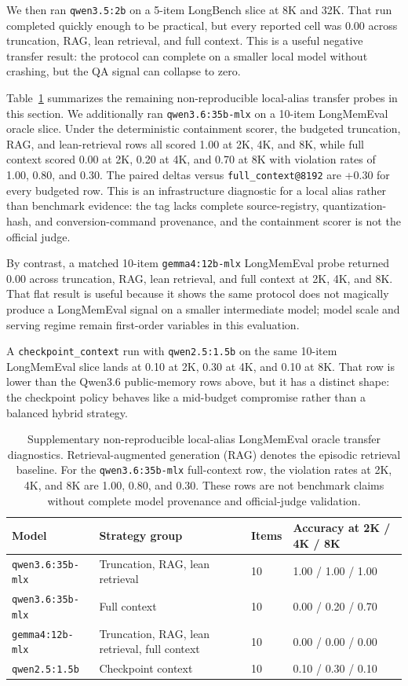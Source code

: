 \documentclass[11pt]{article}
\newcommand{\RunModel}{\texttt{qwen2.5:1.5b}}
\begin{document}
We then ran \texttt{qwen3.5:2b} on a 5-item LongBench slice at 8K and 32K.
That run completed quickly enough to be practical, but every reported cell was
0.00 across truncation, RAG, lean retrieval, and full context.  This is a
useful negative transfer result: the protocol can complete on a smaller local
model without crashing, but the QA signal can collapse to zero.

Table~\ref{tab:longmem_transfer_probes} summarizes the remaining
non-reproducible local-alias transfer probes in this section.  We additionally
ran \texttt{qwen3.6:35b-mlx} on a 10-item LongMemEval oracle
slice.  Under the deterministic containment scorer, the budgeted truncation, RAG, and lean-retrieval rows all scored 1.00
at 2K, 4K, and 8K, while full context scored 0.00 at 2K, 0.20 at 4K, and 0.70
at 8K with violation rates of 1.00, 0.80, and 0.30.  The paired deltas
versus \texttt{full\_context@8192} are +0.30 for every budgeted row.  This is
an infrastructure diagnostic for a local alias rather than benchmark evidence:
the tag lacks complete source-registry, quantization-hash, and
conversion-command provenance, and the containment scorer is not the official
judge.

By contrast, a matched 10-item \texttt{gemma4:12b-mlx} LongMemEval probe
returned 0.00 across truncation, RAG, lean retrieval, and full context at
2K, 4K, and 8K.  That flat result is useful because it shows the same protocol
does not magically produce a LongMemEval signal on a smaller intermediate
model; model scale and serving regime remain first-order variables in this
evaluation.

A \texttt{checkpoint\_context} run with \RunModel{} on the same 10-item
LongMemEval slice lands at 0.10 at 2K, 0.30 at 4K, and 0.10 at 8K.  That row is
lower than the Qwen3.6 public-memory rows above, but it has a distinct shape:
the checkpoint policy behaves like a mid-budget compromise rather than a
balanced hybrid strategy.

\begin{table}[t]
\centering
\small
\setlength{\tabcolsep}{3pt}
\begin{tabular}{llll}
\toprule
Model & Strategy group & Items & Accuracy at 2K / 4K / 8K \\
\midrule
\texttt{qwen3.6:35b-mlx} & Truncation, RAG, lean retrieval & 10 & 1.00 / 1.00 / 1.00 \\
\texttt{qwen3.6:35b-mlx} & Full context & 10 & 0.00 / 0.20 / 0.70 \\
\texttt{gemma4:12b-mlx} & Truncation, RAG, lean retrieval, full context & 10 & 0.00 / 0.00 / 0.00 \\
\RunModel{} & Checkpoint context & 10 & 0.10 / 0.30 / 0.10 \\
\bottomrule
\end{tabular}
\caption{Supplementary non-reproducible local-alias LongMemEval oracle transfer diagnostics.  Retrieval-augmented generation (RAG) denotes the episodic retrieval baseline.  For the \texttt{qwen3.6:35b-mlx} full-context row, the violation rates at 2K, 4K, and 8K are 1.00, 0.80, and 0.30.  These rows are not benchmark claims without complete model provenance and official-judge validation.}
\label{tab:longmem_transfer_probes}
\end{table}
\end{document}

